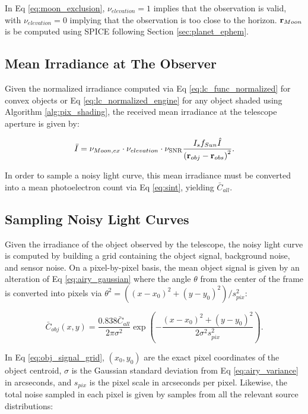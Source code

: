 In Eq \ref{eq:moon_exclusion}, $\nu_{elevation} = 1$ implies that the observation is valid, with $\nu_{elevation} = 0$ implying that the observation is too close to the horizon. $\mathbf{r}_{Moon}$ is be computed using SPICE following Section \ref{sec:planet_ephem}.

\subsection{Mean Irradiance at The Observer}

Given the normalized irradiance computed via Eq \ref{eq:lc_func_normalized} for convex objects or Eq \ref{eq:lc_normalized_engine} for any object shaded using Algorithm \ref{alg:pix_shading}, the received mean irradiance at the telescope aperture is given by:

\begin{equation} \label{eq:mean_irrad_at_aperture}
  \bar{I} = \nu_{Moon,ex} \cdot \nu_{elevation} \cdot \nu_{\mathrm{SNR}} \frac{I_s f_{Sun} \hat{I}}{\left( \mathbf{r}_{obj} - \mathbf{r}_{obs} \right)^2}.
\end{equation}

In order to sample a noisy light curve, this mean irradiance must be converted into a mean photoelectron count via Eq \ref{eq:sint}, yielding $\bar{C}_{all}$.

\subsection{Sampling Noisy Light Curves} \label{sec:sampling_lcs}

Given the irradiance of the object observed by the telescope, the noisy light curve is computed by building a grid containing the object signal, background noise, and sensor noise. On a pixel-by-pixel basis, the mean object signal is given by an alteration of Eq \ref{eq:airy_gaussian} where the angle $\theta$ from the center of the frame is converted into pixels via $\theta^2 = \left((x - x_0)^2 + (y - y_0)^2 \right) / s_{pix}^2$:

\begin{equation} \label{eq:obj_signal_grid}
  \bar{C}_{obj}(x, y) = \frac{0.838 \bar{C}_{all}}{2 \pi \sigma^2} \exp\left( - \frac{(x - x_0)^2 + (y - y_0)^2}{2 \sigma^2  s_{pix}^2} \right).
\end{equation}

In Eq \ref{eq:obj_signal_grid}, $\left(x_0, y_0\right)$ are the exact pixel coordinates of the object centroid, $\sigma$ is the Gaussian standard deviation from Eq \ref{eq:airy_variance} in arcseconds, and $s_{pix}$ is the pixel scale in arcseconds per pixel. Likewise, the total noise sampled in each pixel is given by samples from all the relevant source distributions:

